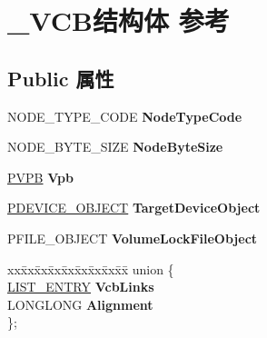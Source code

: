 \hypertarget{struct___v_c_b}{}\section{\+\_\+\+V\+C\+B结构体 参考}
\label{struct___v_c_b}
\subsection*{Public 属性}
\begin{DoxyCompactItemize}
\item 
\mbox{\label{struct___v_c_b_a26c25796f4018adc4aa2679ad3db8c3b}} 
N\+O\+D\+E\+\_\+\+T\+Y\+P\+E\+\_\+\+C\+O\+DE {\bfseries Node\+Type\+Code}
\item 
\mbox{\label{struct___v_c_b_a7699f528891e773e5a4c7d8daed6eebe}} 
N\+O\+D\+E\+\_\+\+B\+Y\+T\+E\+\_\+\+S\+I\+ZE {\bfseries Node\+Byte\+Size}
\item 
\mbox{\label{struct___v_c_b_a245da42374a74303dda77033aed49fc7}} 
\hyperlink{struct___v_p_b}{P\+V\+PB} {\bfseries Vpb}
\item 
\mbox{\label{struct___v_c_b_ac23e2b89cde54f73d74aca54366aa21a}} 
\hyperlink{struct___d_e_v_i_c_e___o_b_j_e_c_t}{P\+D\+E\+V\+I\+C\+E\+\_\+\+O\+B\+J\+E\+CT} {\bfseries Target\+Device\+Object}
\item 
\mbox{\label{struct___v_c_b_a6e30ff42bb28123d4d427424e4dcc8d7}} 
P\+F\+I\+L\+E\+\_\+\+O\+B\+J\+E\+CT {\bfseries Volume\+Lock\+File\+Object}
\item 
\mbox{\label{struct___v_c_b_a8bd77395c4b42e46ffa07254f6217153}} 
\begin{tabbing}
xx\=xx\=xx\=xx\=xx\=xx\=xx\=xx\=xx\=\kill
union \{\\
\>\hyperlink{struct___l_i_s_t___e_n_t_r_y}{LIST\_ENTRY} {\bfseries VcbLinks}\\
\>LONGLONG {\bfseries Alignment}\\
\}; \\


\end{tabbing}
\end{DoxyCompactItemize}
